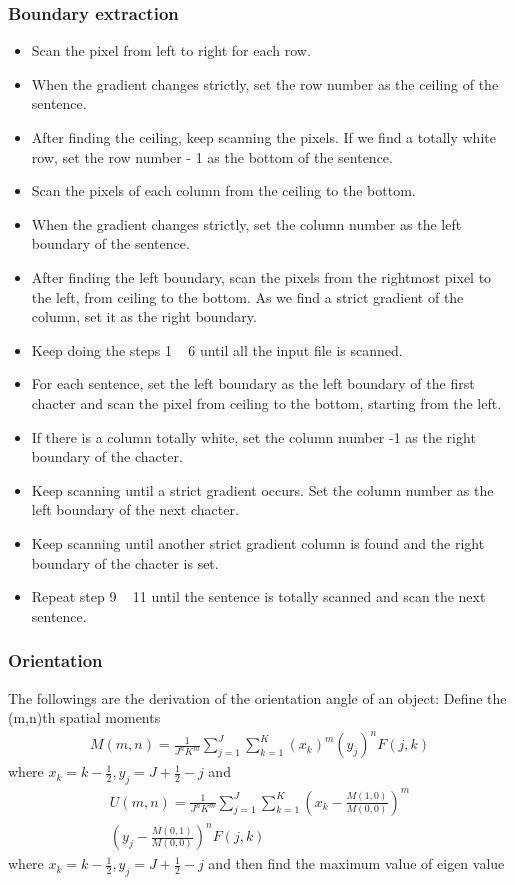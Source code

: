 \documentclass{article}
\begin{document}
\subsubsection{Boundary extraction}
\begin{itemize}
\item Scan the pixel from left to right for each row.
\item When the gradient changes strictly, set the row number as the ceiling of the sentence.
\item After finding the ceiling, keep scanning the pixels. If we find a totally white row, set the row number - 1 as the bottom of the sentence.
\item Scan the pixels of each column from the ceiling to the bottom.
\item When the gradient changes strictly, set the column number as the left boundary of the sentence.
\item After finding the left boundary, scan the pixels from the rightmost pixel to the left, from ceiling to the bottom. As we find a strict gradient of the column, set it as the right boundary.
\item Keep doing the steps 1 ~ 6 until all the input file is scanned.
\item For each sentence, set the left boundary as the left boundary of the first chacter and scan the pixel from ceiling to the bottom, starting from the left.
\item If there is a column totally white, set the column number -1 as the right boundary of the chacter.
\item Keep scanning until a strict gradient occurs. Set the column number as the left boundary of the next chacter.
\item Keep scanning until another strict gradient column is found and the right boundary of the chacter is set.
\item Repeat step 9 ~ 11 until the sentence is totally scanned and scan the next sentence.
\end{itemize}

\subsubsection{Orientation}

The followings are the derivation of the orientation angle of an object:
Define the (m,n)th spatial moments
\begin{multline}
M(m,n)=\frac{1}{J^n K^m}\sum_{j=1}^J\sum_{k=1}^K (x_k)^m (y_j)^n F(j,k)
\end{multline}
where $x_k=k-\frac{1}{2}, y_j=J+\frac{1}{2}-j$ and
\begin{multline}
U(m,n)=\frac{1}{J^n K^m}\sum_{j=1}^J\sum_{k=1}^K \left(x_k-\frac{M(1,0)}{M(0,0)}\right)^m \\ \left(y_j-\frac{M(0,1)}{M(0,0)}\right)^n F(j,k)
\end{multline}
where $x_k=k-\frac{1}{2}, y_j=J+\frac{1}{2}-j$ and then find the maximum value of eigen value
\end{document}

